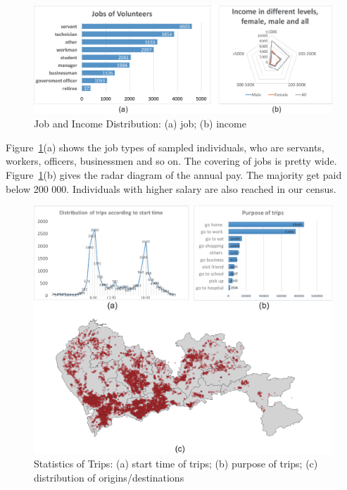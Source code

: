 \begin{figure}[htb!]
 \centering %
 \includegraphics[width=\columnwidth]{pictures/data2}
 \caption{Job and Income Distribution: (a) job; (b) income}
 \label{fig:data_job_inc}
\end{figure}

Figure~\ref{fig:data_job_inc}(a) shows the job types of sampled individuals, who are servants, workers, officers, businessmen and so on. The covering of jobs is pretty wide. Figure~\ref{fig:data_job_inc}(b) gives the radar diagram of the annual pay. The majority get paid below 200 000. Individuals with higher salary are also reached in our census.

\begin{figure}[htb!]
 \centering %
 \includegraphics[width=\columnwidth]{pictures/data3}
 \caption{Statistics of Trips: (a) start time of trips; (b) purpose of trips; (c) distribution of origins/destinations }
 \label{fig:data_geometry}
\end{figure}

